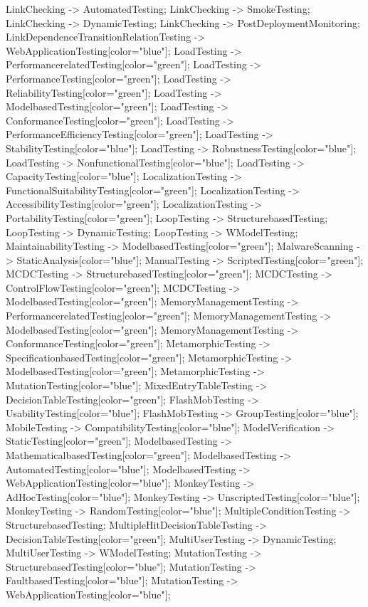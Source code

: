 \documentclass{article}
\begin{document}
{LinkChecking -> AutomatedTesting;
LinkChecking -> SmokeTesting;
LinkChecking -> DynamicTesting;
LinkChecking -> PostDeploymentMonitoring;
LinkDependenceTransitionRelationTesting -> WebApplicationTesting[color="blue"];
LoadTesting -> PerformancerelatedTesting[color="green"];
LoadTesting -> PerformanceTesting[color="green"];
LoadTesting -> ReliabilityTesting[color="green"];
LoadTesting -> ModelbasedTesting[color="green"];
LoadTesting -> ConformanceTesting[color="green"];
LoadTesting -> PerformanceEfficiencyTesting[color="green"];
LoadTesting -> StabilityTesting[color="blue"];
LoadTesting -> RobustnessTesting[color="blue"];
LoadTesting -> NonfunctionalTesting[color="blue"];
LoadTesting -> CapacityTesting[color="blue"];
LocalizationTesting -> FunctionalSuitabilityTesting[color="green"];
LocalizationTesting -> AccessibilityTesting[color="green"];
LocalizationTesting -> PortabilityTesting[color="green"];
LoopTesting -> StructurebasedTesting;
LoopTesting -> DynamicTesting;
LoopTesting -> WModelTesting;
MaintainabilityTesting -> ModelbasedTesting[color="green"];
MalwareScanning -> StaticAnalysis[color="blue"];
ManualTesting -> ScriptedTesting[color="green"];
MCDCTesting -> StructurebasedTesting[color="green"];
MCDCTesting -> ControlFlowTesting[color="green"];
MCDCTesting -> ModelbasedTesting[color="green"];
MemoryManagementTesting -> PerformancerelatedTesting[color="green"];
MemoryManagementTesting -> ModelbasedTesting[color="green"];
MemoryManagementTesting -> ConformanceTesting[color="green"];
MetamorphicTesting -> SpecificationbasedTesting[color="green"];
MetamorphicTesting -> ModelbasedTesting[color="green"];
MetamorphicTesting -> MutationTesting[color="blue"];
MixedEntryTableTesting -> DecisionTableTesting[color="green"];
FlashMobTesting -> UsabilityTesting[color="blue"];
FlashMobTesting -> GroupTesting[color="blue"];
MobileTesting -> CompatibilityTesting[color="blue"];
ModelVerification -> StaticTesting[color="green"];
ModelbasedTesting -> MathematicalbasedTesting[color="green"];
ModelbasedTesting -> AutomatedTesting[color="blue"];
ModelbasedTesting -> WebApplicationTesting[color="blue"];
MonkeyTesting -> AdHocTesting[color="blue"];
MonkeyTesting -> UnscriptedTesting[color="blue"];
MonkeyTesting -> RandomTesting[color="blue"];
MultipleConditionTesting -> StructurebasedTesting;
MultipleHitDecisionTableTesting -> DecisionTableTesting[color="green"];
MultiUserTesting -> DynamicTesting;
MultiUserTesting -> WModelTesting;
MutationTesting -> StructurebasedTesting[color="blue"];
MutationTesting -> FaultbasedTesting[color="blue"];
MutationTesting -> WebApplicationTesting[color="blue"];
}
\end{document}
